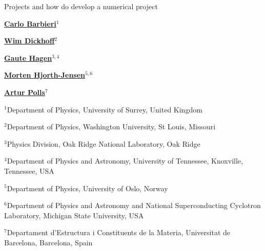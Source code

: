 \documentclass[%
twoside,                 %
final,                   %
10pt]{article}
\begin{document}






\thispagestyle{empty}

\begin{center}
{\LARGE\bf
\begin{spacing}{1.25}
Projects and how do develop a numerical project
\end{spacing}
}
\end{center}


\begin{center}
{\bf \href{{http://www.surrey.ac.uk/physics/people/carlo_barbieri/}}{Carlo Barbieri}${}^{1}$} \\ [0mm]
\end{center}

    
\begin{center}
{\bf \href{{https://www.physics.wustl.edu/people/dickhoff_willem-h}}{Wim Dickhoff}${}^{2}$} \\ [0mm]
\end{center}

    
\begin{center}
{\bf \href{{https://scholar.google.com/citations?user=n6JHe5sAAAAJ&hl=en}}{Gaute Hagen}${}^{3, 4}$} \\ [0mm]
\end{center}

    
\begin{center}
{\bf \href{{http://computationalphysics.no/}}{Morten Hjorth-Jensen}${}^{5, 6}$} \\ [0mm]
\end{center}

    
\begin{center}
{\bf \href{{http://www.ecm.ub.edu/~artur/}}{Artur Polls}${}^{7}$} \\ [0mm]
\end{center}

    \begin{center}
\centerline{{\small ${}^1$Department of Physics, University of Surrey, United Kingdom}}
\centerline{{\small ${}^2$Department of Physics, Washington University, St Louis, Missouri}}
\centerline{{\small ${}^3$Physics Division, Oak Ridge National Laboratory, Oak Ridge}}
\centerline{{\small ${}^4$Department of Physics and Astronomy, University of Tennessee, Knoxville, Tennessee, USA}}
\centerline{{\small ${}^5$Department of Physics, University of Oslo, Norway}}
\centerline{{\small ${}^6$Department of Physics and Astronomy and National Superconducting Cyclotron Laboratory, Michigan State University, USA}}
\centerline{{\small ${}^7$Departament d'Estructura i Constituents de la Materia, Universitat de Barcelona, Barcelona, Spain}}
\end{center}
    
\end{document}
